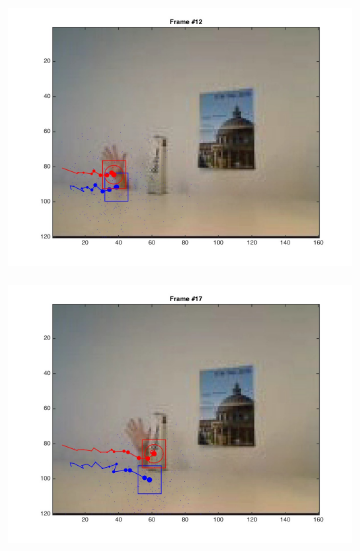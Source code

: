 \documentclass{ethz_report}
\begin{document}
\begin{figure}[h]
\begin{subfigure}[b]{.25\textwidth}
        \includegraphics[width=1\linewidth]{images/video2_model_11}
    \end{subfigure}%
    \begin{subfigure}[b]{.25\textwidth}
        \centering
        \includegraphics[width=1\linewidth]{images/video2_model_16}
    \end{subfigure}
    \begin{subfigure}[b]{.25\textwidth}
        \centering

\end{subfigure}
\end{figure}
\end{document}
